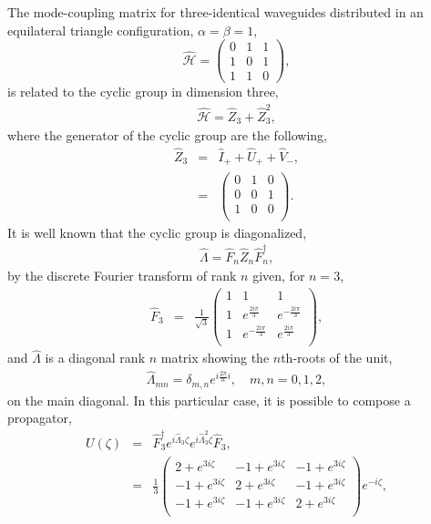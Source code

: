 \documentclass[9pt,twocolumn,twoside]{osajnl}
\begin{document}
The mode-coupling matrix for three-identical waveguides distributed in an equilateral triangle configuration, $\alpha = \beta = 1$, 
\begin{equation}
\hat{\mathcal{H}}=\left( \begin{array}{ccc}
0 & 1 & 1 \\
1 & 0 & 1 \\
1 & 1 & 0 \end{array} \right),	 
\end{equation}
is related to the cyclic group in dimension three, 
\begin{eqnarray}
\hat{\mathcal{H}} =  \hat{Z}_{3} + \hat{Z}_{3}^{2} ,
\end{eqnarray}
where the generator of the cyclic group are the following, 
\begin{eqnarray}
\hat{Z}_{3} &=& \hat{I}_{+} + \hat{U}_{+} + \hat{V}_{-}, \nonumber \\
&=&\left(
\begin{array}{ccc}
 0 & 1 & 0 \\
 0 & 0 & 1 \\
 1 & 0 & 0 \\
\end{array}\right).
\end{eqnarray}
It is well known that the cyclic group is diagonalized, 
\begin{eqnarray}
\hat{\Lambda} = \hat{F}_{n} \hat{Z}_{n} \hat{F}_{n}^{\dagger},
\end{eqnarray}
by the discrete Fourier transform of rank $n$ given, for $n=3$,
\begin{eqnarray}
\hat{F}_{3} &=& 
\frac{1}{\sqrt{3}}
\left(
\begin{array}{ccc}
 1 & 1 & 1 \\
 1 & e^{\frac{2 i \pi}{3}} & e^{-\frac{2 i \pi}{3}} \\
 1 & e^{-\frac{2 i \pi}{3}} & e^{\frac{2 i \pi}{3}} \\
\end{array}\right),
\end{eqnarray}
and $\hat{\Lambda}$ is a diagonal rank $n$ matrix showing the $n$th-roots of the unit,
\begin{eqnarray}
\hat{\Lambda}_{mn} = \delta_{m,n} e^{ i \frac{2 \pi}{n} i}, \quad  m,n = 0,1,2,
\end{eqnarray} 
on the main diagonal.
In this particular case, it is possible to compose a propagator,
\begin{eqnarray}
U(\zeta) &=& \hat{F}_{3}^{\dagger} e^{i \hat{\Lambda}_{3} \zeta} e^{i \hat{\Lambda}_{3}^{2} \zeta} \hat{F}_{3}, \nonumber \\
&=& \frac{1}{3}\left(
\begin{array}{ccc}
 2+e^{3 i \zeta} & -1+e^{3 i \zeta} & -1+e^{3 i \zeta} \\
 -1+e^{3 i \zeta} & 2+e^{3 i \zeta} & -1+e^{3 i \zeta} \\
 -1+e^{3 i \zeta} & -1+e^{3 i \zeta} & 2+e^{3 i \zeta} \\
\end{array}
\right) e^{-i \zeta}, \nonumber \\
\end{eqnarray}
\end{document}
